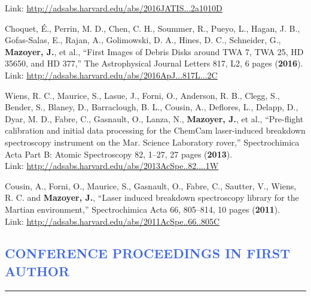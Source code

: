 \documentclass[12pt]{article}
\begin{document}
\begin{etaremune}
Link: \textcolor{BrickRed}{\underline{\url{http://adsabs.harvard.edu/abs/2016JATIS...2a1010D}}}
\item Choquet, É., Perrin, M. D., Chen, C. H., Soummer, R., Pueyo, L., Hagan, J. B., Gofas-Salas, E., Rajan, A., Golimowski, D. A., Hines, D. C., Schneider, G., \textbf{Mazoyer, J.}, et al., “First Images of Debris Disks around TWA 7, TWA 25, HD 35650, and HD 377,” The Astrophysical Journal Letters 817, L2, 6 pages (\textbf{2016}).\\
 Link: \textcolor{BrickRed}{\underline{\url{http://adsabs.harvard.edu/abs/2016ApJ...817L...2C}}}
\item Wiens, R. C., Maurice, S., Lasue, J., Forni, O., Anderson, R. B., Clegg, S., Bender, S., Blaney, D., Barraclough, B. L., Cousin, A., Deflores, L., Delapp, D., Dyar, M. D., Fabre, C., Gasnault, O., Lanza, N., \textbf{Mazoyer, J.}, et al., “Pre-flight calibration and initial data processing for the ChemCam laser-induced breakdown spectroscopy instrument on the Mar. Science Laboratory rover,” Spectrochimica Acta Part B: Atomic Spectroscopy 82, 1–27, 27 pages (\textbf{2013}).\\
Link: \textcolor{BrickRed}{\underline{\url{http://adsabs.harvard.edu/abs/2013AcSpe..82....1W}}}
\item Cousin, A., Forni, O., Maurice, S., Gasnault, O., Fabre, C., Sautter, V., Wiens, R. C. and \textbf{Mazoyer, J.}, “Laser induced breakdown spectroscopy library for the Martian environment,” Spectrochimica Acta 66, 805–814, 10 pages (\textbf{2011}).\\
Link: \textcolor{BrickRed}{\underline{\url{http://adsabs.harvard.edu/abs/2011AcSpe..66..805C}}}
\end{etaremune}


\vspace{-1cm}
\textcolor{RoyalBlue}{\section{\large CONFERENCE PROCEEDINGS IN FIRST AUTHOR}
\vspace{-0.35cm}\hrule}
\vspace{0.5cm}
\end{document}
